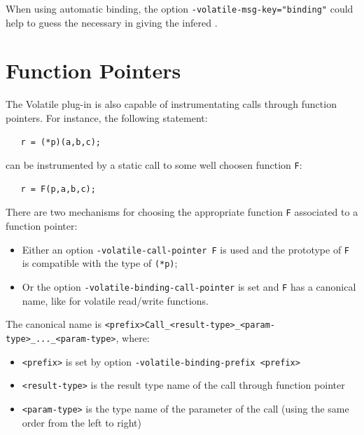 \documentclass{frama-c-book}
\begin{document}
When using automatic binding, the option \verb|-volatile-msg-key="binding"| could help to guess the necessary {\sl <function-name>} in giving the infered {\sl <type-name>}.

\chapter{Function Pointers}

The Volatile plug-in is also capable of instrumentating calls through function pointers.
For instance, the following statement:
\begin{verbatim}
   r = (*p)(a,b,c);
\end{verbatim}
can be instrumented by a static call to some well choosen function \verb+F+:
\begin{verbatim}
   r = F(p,a,b,c);
\end{verbatim}

There are two mechanisms for choosing the appropriate function \verb+F+ associated to a function pointer:
\begin{itemize}
\item Either an option \verb+-volatile-call-pointer F+ is used and the prototype of \verb+F+ is compatible with
  the type of \verb+(*p)+;
\item Or the option \verb+-volatile-binding-call-pointer+ is set and \verb+F+ has a canonical name, like for volatile read/write functions.
\end{itemize}

The canonical name is \verb+<prefix>Call_<result-type>_<param-type>_..._<param-type>+, where:
\begin{itemize}
\item \verb+<prefix>+ is set by option \verb+-volatile-binding-prefix <prefix>+
\item \verb+<result-type>+ is the result type name of the call through function pointer
\item \verb+<param-type>+ is the type name of the parameter of the call (using the same order from the left to right)
\end{itemize}

\appendix





\cleardoublepage
\end{document}
